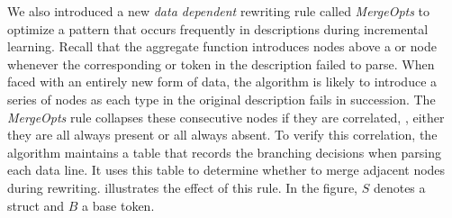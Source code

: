 We also introduced a new {\em data dependent} rewriting rule called {\em MergeOpts}
to optimize a pattern that occurs frequently in descriptions during incremental
learning.  Recall that the aggregate function
introduces  nodes above a  or  node 
whenever the corresponding  or  token in 
the description failed to 
parse. When faced with an entirely new form of data, 
the algorithm is likely to introduce a series of  nodes as
each type in the original description fails in succession. 
The {\em MergeOpts} rule collapses these consecutive  nodes if they
are correlated, \ie{}, either they are all always present or all always
absent.  To verify this correlation, the algorithm maintains a
table that records the branching decisions when parsing each
data line. It uses this table to determine whether to merge
adjacent  nodes during rewriting. 
 illustrates the effect of this rule.  In the figure,
$S$ denotes a struct and $B$ a base token.

